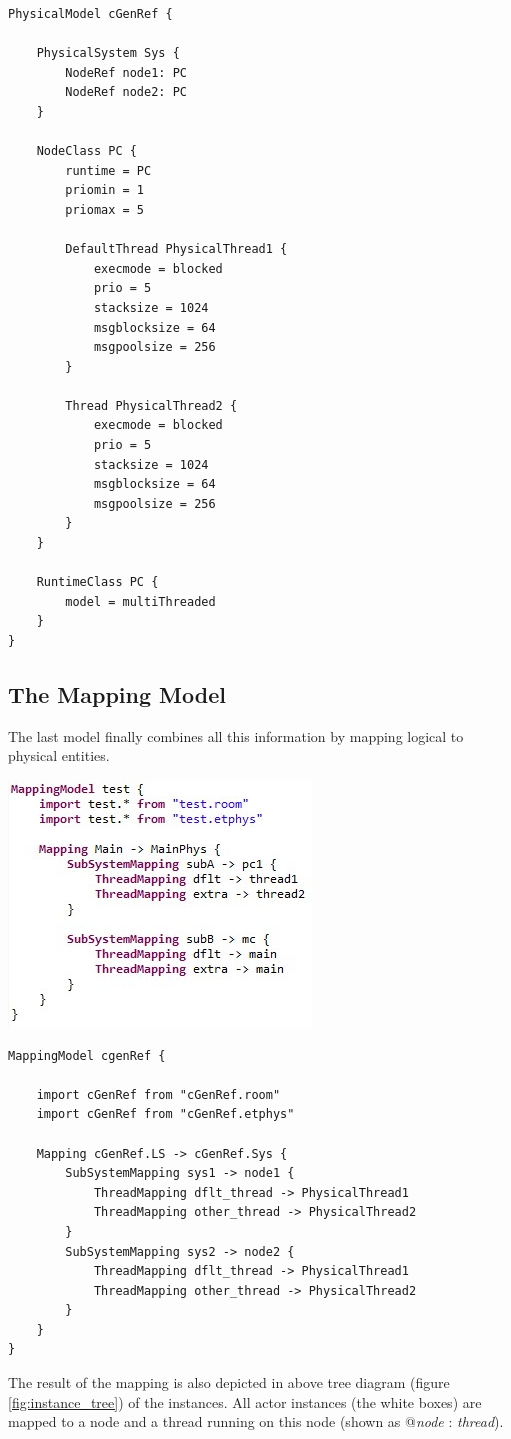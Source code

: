 \begin{lstlisting}[language=etPhys]
PhysicalModel cGenRef {

	PhysicalSystem Sys {
		NodeRef node1: PC
		NodeRef node2: PC
	}
	
	NodeClass PC {
		runtime = PC
		priomin = 1
		priomax = 5
		
		DefaultThread PhysicalThread1 {
			execmode = blocked
			prio = 5
			stacksize = 1024
			msgblocksize = 64
			msgpoolsize = 256
		}
		
		Thread PhysicalThread2 {
			execmode = blocked
			prio = 5
			stacksize = 1024
			msgblocksize = 64
			msgpoolsize = 256
		}
	}
	
	RuntimeClass PC {
		model = multiThreaded
	}
}
\end{lstlisting}

\subsection{The Mapping Model}
\label{sec:mapping_model}

The last model finally combines all this information by mapping logical to physical entities.

\includegraphics{images/080-map.jpg}

\begin{lstlisting}[language=etMap]
MappingModel cgenRef {
	
	import cGenRef from "cGenRef.room"
	import cGenRef from "cGenRef.etphys"
	
	Mapping cGenRef.LS -> cGenRef.Sys {
		SubSystemMapping sys1 -> node1 {
			ThreadMapping dflt_thread -> PhysicalThread1
			ThreadMapping other_thread -> PhysicalThread2
		}
		SubSystemMapping sys2 -> node2 {
			ThreadMapping dflt_thread -> PhysicalThread1
			ThreadMapping other_thread -> PhysicalThread2
		}
	}
}
\end{lstlisting}

The result of the mapping is also depicted in above tree diagram (figure \ref{fig:instance_tree})
of the instances. All actor instances (the white boxes) are mapped to a node and a thread running on this node
(shown as @\textit{node} : \textit{thread}).

